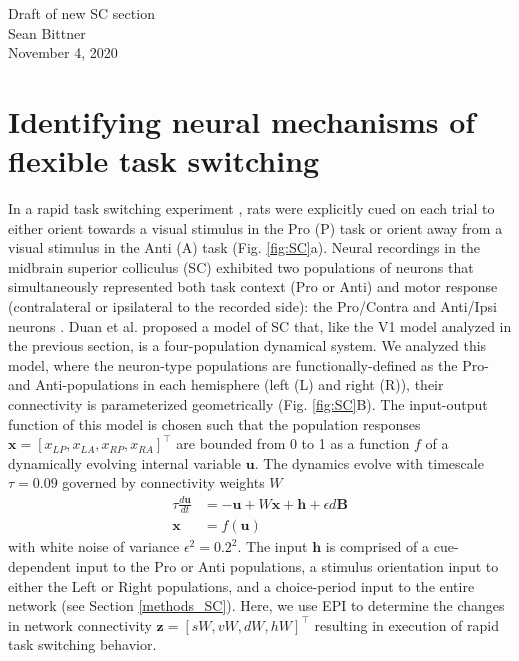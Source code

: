 \documentclass[11pt]{article}
\begin{document}
\medskip                        %

\thispagestyle{plain}
\begin{center}                  %
{\Large Draft of new SC section} \\
Sean Bittner \\
November 4, 2020 \\
\end{center}

\section{Identifying neural mechanisms of flexible task switching} \label{results_SC}
In a rapid task switching experiment \cite{duan2015requirement}, rats were explicitly cued on each trial to either orient towards a visual stimulus in the Pro (P) task or orient away from a visual stimulus in the Anti (A) task (Fig. \ref{fig:SC}a). 
Neural recordings in the midbrain superior colliculus (SC) exhibited two populations of neurons that simultaneously represented both task context (Pro or Anti) and motor response (contralateral or ipsilateral to the recorded side): the Pro/Contra and Anti/Ipsi neurons \cite{duan2018collicular}.
Duan et al. proposed a model of SC that, like the V1 model analyzed in the previous section, is a four-population dynamical system.  
We analyzed this model, where the neuron-type populations are functionally-defined as the Pro- and Anti-populations in each hemisphere (left (L) and right (R)), their connectivity is parameterized geometrically  (Fig. \ref{fig:SC}B).
The input-output function of this model is chosen such that the population responses $\mathbf{x} = [x_{LP}, x_{LA}, x_{RP}, x_{RA}]^\top$ are bounded from 0 to 1 as a function $f$ of a dynamically evolving internal variable $\mathbf{u}$.
The dynamics evolve with timescale $\tau=0.09$ governed by connectivity weights $W$
\begin{equation}
\begin{split}
\tau \frac{d\mathbf{u}}{dt} &= -\mathbf{u} + W\mathbf{x} + \mathbf{h} + \epsilon d\mathbf{B} \\
\mathbf{x} &= f(\mathbf{u})
\end{split}
\end{equation}
with white noise of variance $\epsilon^2 = 0.2^2$.
The input $\mathbf{h}$ is comprised of a cue-dependent input to the Pro or Anti populations, a stimulus orientation input to either the Left or Right populations, and a choice-period input to the entire network (see Section \ref{methods_SC}).
Here, we use EPI to determine the changes in network connectivity $\mathbf{z} = [sW, vW, dW, hW]^{\top}$ resulting in execution of rapid task switching behavior.
\end{document}

